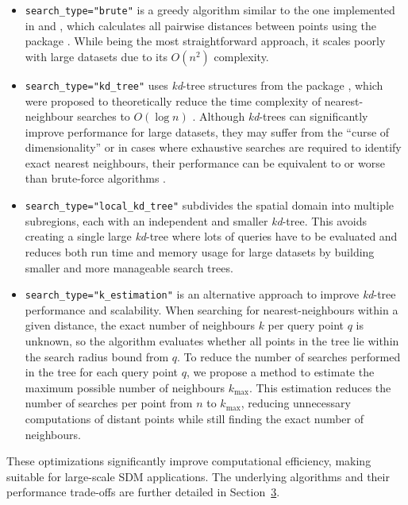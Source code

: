 \begin{itemize}
\tightlist
\item
  \texttt{search\_type="brute"} is a greedy algorithm similar to the one implemented in  and , which calculates all pairwise distances between points using the  package \citep{fieldsRpackage}. While being the most straightforward approach, it scales poorly with large datasets due to its \(O(n^2)\) complexity.
\item
  \texttt{search\_type="kd\_tree"} uses \emph{kd}-tree structures from the  package \citep{elsebergcomparison}, which were proposed to theoretically reduce the time complexity of nearest-neighbour searches to \(O(\log n)\) \citep{friedman1975algorithm}. Although \emph{kd}-trees can significantly improve performance for large datasets, they may suffer from the ``curse of dimensionality'' or in cases where exhaustive searches are required to identify exact nearest neighbours, their performance can be equivalent to or worse than brute-force algorithms \citep{ram2019revisiting}.
\item
  \texttt{search\_type="local\_kd\_tree"} subdivides the spatial domain into multiple subregions, each with an independent and smaller \emph{kd}-tree. This avoids creating a single large \emph{kd}-tree where lots of queries have to be evaluated and reduces both run time and memory usage for large datasets by building smaller and more manageable search trees.
\item
  \texttt{search\_type="k\_estimation"} is an alternative approach to improve \emph{kd}-tree performance and scalability. When searching for nearest-neighbours within a given distance, the exact number of neighbours \(k\) per query point \(q\) is unknown, so the algorithm evaluates whether all points in the tree lie within the search radius bound from \(q\). To reduce the number of searches performed in the tree for each query point \(q\), we propose a method to estimate the maximum possible number of neighbours \(k_\text{max}\). This estimation reduces the number of searches per point from \(n\) to \(k_\text{max}\), reducing unnecessary computations of distant points while still finding the exact number of neighbours.
\end{itemize}

These optimizations significantly improve computational efficiency, making  suitable for large-scale SDM applications. The underlying algorithms and their performance trade-offs are further detailed in Section~\hyperref[modifiedthinning]{3}.

